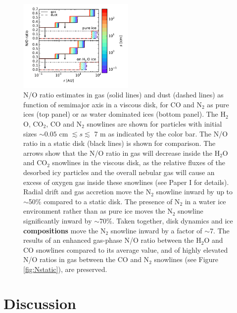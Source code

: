 \documentclass[apj]{emulateapj}
\begin{document}
\begin{figure}[h!]
\centering
\includegraphics[width=0.5\textwidth]{N_O_water_ice_many.pdf}
\caption{N/O ratio estimates in gas (solid lines) and dust (dashed lines) as function of semimajor axis in a viscous disk, for CO and N$_2$ as pure ices (top panel) or as water dominated ices (bottom panel). The H$_2$O, CO$_2$, CO and N$_2$ snowlines are shown for particles with initial sizes $\sim0.05$ cm $\lesssim s \lesssim$ 7 m as indicated by the color bar. The N/O ratio in a static disk (black lines) is shown for comparison. The arrows show that the N/O ratio in gas will decrease inside the H$_2$O and CO$_2$ snowlines in the viscous disk, as the relative fluxes of the desorbed icy
particles and the overall nebular gas will cause an excess of oxygen gas inside these snowlines (see Paper I for details). Radial drift and gas accretion move the N$_2$ snowline inward by up to $\sim$50\% compared to a static disk. The presence of N$_2$ in a water ice environment rather than as pure ice moves the N$_2$ snowline significantly inward by $\sim$70\%. Taken together, disk dynamics and ice \textbf{compositions} move the N$_2$ snowline inward by a factor of $\sim$7. The results of an enhanced gas-phase N/O ratio between the H$_2$O and CO snowlines compared to its average value, and of highly elevated N/O ratios in gas between the CO and N$_2$ snowlines (see Figure \ref{fig:Nstatic}), are preserved.}  
\label{fig:NO_ratio}
\end{figure}





\section{Discussion}
\label{sec:discussion}
\end{document}
